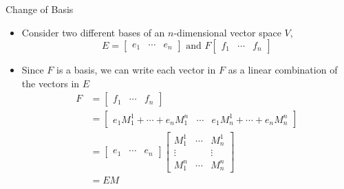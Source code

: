 \documentclass[usenames,dvipsnames,10pt]{beamer}
\begin{document}
\begin{frame}
  {Change of Basis}

  \begin{itemize}
  \item Consider two different bases of an $n$-dimensional vector space $V$,
    \[
      E = \begin{bmatrix} e_1 & \cdots & e_n \end{bmatrix}\text{ and }
      F  \begin{bmatrix} f_1 & \cdots & f_n \end{bmatrix}
    \]
  \item Since $F$ is a basis, we can write each vector in $F$ as a linear combination of the vectors in $E$
    \begin{align*}
      F &= \begin{bmatrix} f_1 & \cdots & f_n\end{bmatrix}\\
        &= \begin{bmatrix} e_1M_1^1 + \cdots + e_nM_1^n & \cdots & e_1M_n^1 + \cdots + e_nM_n^n \end{bmatrix}\\
        &= \begin{bmatrix} e_1 & \cdots & e_n \end{bmatrix}
          \begin{bmatrix} M^1_1 & \cdots & M^1_n \\ \vdots & & \vdots \\ M^n_1 & \cdots & M^n_n \end{bmatrix}\\
        &= EM
    \end{align*}
  \end{itemize}
\end{frame}
\end{document}
